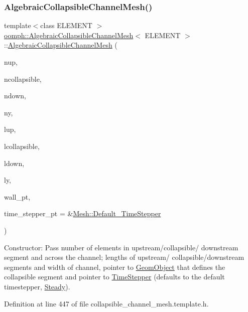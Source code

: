 \subsubsection{\texorpdfstring{Algebraic\+Collapsible\+Channel\+Mesh()}{AlgebraicCollapsibleChannelMesh()}\hspace{0.1cm}{\footnotesize\ttfamily [1/2]}}
{\footnotesize\ttfamily template$<$class E\+L\+E\+M\+E\+NT $>$ \\
\hyperlink{classoomph_1_1AlgebraicCollapsibleChannelMesh}{oomph\+::\+Algebraic\+Collapsible\+Channel\+Mesh}$<$ E\+L\+E\+M\+E\+NT $>$\+::\hyperlink{classoomph_1_1AlgebraicCollapsibleChannelMesh}{Algebraic\+Collapsible\+Channel\+Mesh} (\begin{DoxyParamCaption}\item[{const unsigned \&}]{nup,  }\item[{const unsigned \&}]{ncollapsible,  }\item[{const unsigned \&}]{ndown,  }\item[{const unsigned \&}]{ny,  }\item[{const double \&}]{lup,  }\item[{const double \&}]{lcollapsible,  }\item[{const double \&}]{ldown,  }\item[{const double \&}]{ly,  }\item[{\hyperlink{classoomph_1_1GeomObject}{Geom\+Object} $\ast$}]{wall\+\_\+pt,  }\item[{\hyperlink{classoomph_1_1TimeStepper}{Time\+Stepper} $\ast$}]{time\+\_\+stepper\+\_\+pt = {\ttfamily \&\hyperlink{classoomph_1_1Mesh_a12243d0fee2b1fcee729ee5a4777ea10}{Mesh\+::\+Default\+\_\+\+Time\+Stepper}} }\end{DoxyParamCaption})\hspace{0.3cm}{\ttfamily [inline]}}



Constructor\+: Pass number of elements in upstream/collapsible/ downstream segment and across the channel; lengths of upstream/ collapsible/downstream segments and width of channel, pointer to \hyperlink{classoomph_1_1GeomObject}{Geom\+Object} that defines the collapsible segment and pointer to \hyperlink{classoomph_1_1TimeStepper}{Time\+Stepper} (defaults to the default timestepper, \hyperlink{classoomph_1_1Steady}{Steady}). 



Definition at line 447 of file collapsible\+\_\+channel\+\_\+mesh.\+template.\+h.



